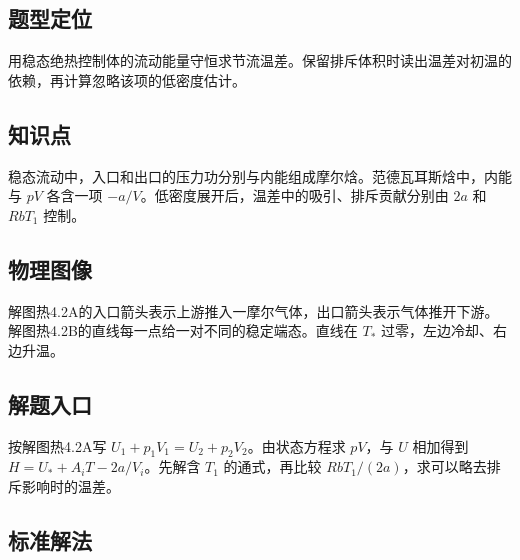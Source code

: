 \documentclass[UTF8,fontset=fandol,a4paper,11pt]{ctexart}
\begin{document}


\subsection*{题型定位}

用稳态绝热控制体的流动能量守恒求节流温差。保留排斥体积时读出温差对初温的依赖，再计算忽略该项的低密度估计。



\subsection*{知识点}

稳态流动中，入口和出口的压力功分别与内能组成摩尔焓。范德瓦耳斯焓中，内能与 $pV$ 各含一项 $-a/V$。低密度展开后，温差中的吸引、排斥贡献分别由 $2a$ 和 $RbT_1$ 控制。




\subsection*{物理图像}

解图热4.2A的入口箭头表示上游推入一摩尔气体，出口箭头表示气体推开下游。解图热4.2B的直线每一点给一对不同的稳定端态。直线在 $T_*$ 过零，左边冷却、右边升温。



\subsection*{解题入口}

按解图热4.2A写 $U_1+p_1V_1=U_2+p_2V_2$。由状态方程求 $pV$，与 $U$ 相加得到 $H=U_*+A_iT-2a/V_i$。先解含 $T_1$ 的通式，再比较 $RbT_1/(2a)$，求可以略去排斥影响时的温差。




\subsection*{标准解法}
\end{document}
